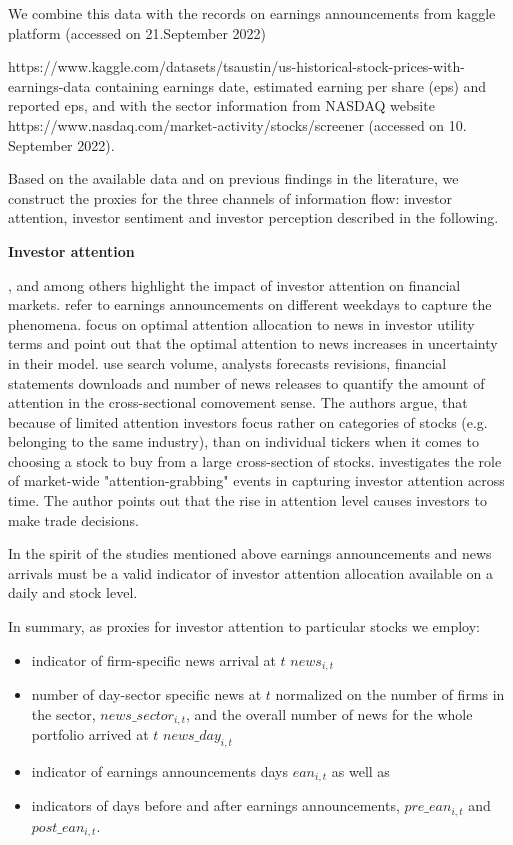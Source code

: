 \documentclass[]{article}
\providecommand{\tightlist}{%
  \setlength{\itemsep}{0pt}\setlength{\parskip}{0pt}}
\begin{document}
We combine this data with the records on earnings announcements from kaggle platform (accessed on 21.September 2022) 

https://www.kaggle.com/datasets/tsaustin/us-historical-stock-prices-with-earnings-data containing earnings date, estimated earning per share (eps) and reported eps,  and with the sector information from NASDAQ website https://www.nasdaq.com/market-activity/stocks/screener (accessed on 10. September 2022).

Based on the available data and on previous findings in the literature, we construct the proxies for the three channels of information flow: investor attention, investor sentiment and investor perception described in the following.

\vspace{0.5cm}
{\bf {Investor attention}}

\cite{chen2022},  \cite{daniel2020} and \cite{dellavigna2009} among others highlight the impact of investor attention on financial markets. \cite{dellavigna2009} refer to earnings announcements on different weekdays to capture the phenomena. \cite{daniel2020} focus on optimal attention allocation to news in investor utility terms and point out that the optimal attention to news increases in uncertainty in their model. \cite{drake2017} use search volume, analysts forecasts revisions, financial statements downloads and number of news releases to quantify the amount of attention in the cross-sectional comovement sense. The authors argue, that because of limited attention investors focus rather on categories of stocks (e.g. belonging to the same industry), than on individual tickers when it comes to choosing a stock to buy from a large cross-section of stocks. \cite{YUAN2015} investigates the role of market-wide "attention-grabbing" events in capturing investor attention across time. The author points out that the rise in attention level causes investors to make trade decisions.

In the spirit of the studies mentioned above earnings announcements and news arrivals must be a valid indicator of investor attention allocation available on a daily and stock level.

In summary, as proxies for investor attention to particular stocks we employ:

\begin{itemize}
\tightlist
\item
  indicator of firm-specific news arrival at \(t\) \(news_{i,t}\)
\item
  number of day-sector specific news at \(t\) normalized on the number of firms in the sector, \(news\_sector_{i,t}\), and the overall number of news for the whole portfolio arrived at \(t\) \(news\_day_{i,t}\)
\item
  indicator of earnings announcements days \(ean_{i,t}\) as well as
\item
  indicators of days before and after earnings announcements, \(pre\_ean_{i,t}\) and \(post\_ean_{i,t}\).
\end{itemize}
\end{document}
